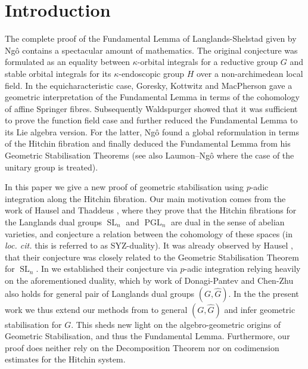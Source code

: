 \documentclass{article}
\DeclareMathOperator{\PGL}{PGL}
\DeclareMathOperator{\SL}{SL}
\theoremstyle{definition}
\theoremstyle{plain}
\begin{document}
\section{Introduction}

The complete proof of the Fundamental Lemma of Langlands-Shelstad given by Ng\^o \cite{MR2653248} contains a spectacular amount of mathematics. The original conjecture was formulated as an equality between $\kappa$-orbital integrals for a reductive group $G$ and stable orbital integrals for its $\kappa$-endoscopic group $H$ over a non-archimedean local field. In the equicharacteristic case, Goresky, Kottwitz and MacPherson \cite{GMK04} gave a geometric interpretation of the Fundamental Lemma in terms of the cohomology of affine Springer fibres. Subsequently Waldspurger \cite{Wa06} showed that it was sufficient to prove the function field case and further reduced the Fundamental Lemma to its Lie algebra version. For the latter, Ng\^o found a global reformulation in terms of the Hitchin fibration and finally deduced the Fundamental Lemma from his Geometric Stabilisation Theorems \cite[Theorem 6.4.1, Theorem 6.4.2]{MR2653248} (see also Laumon--Ng\^o \cite{MR2434884} where the case of the unitary group is treated).




In this paper we give a new proof of geometric stabilisation using $p$-adic integration along the Hitchin fibration. Our main motivation comes from the work of Hausel and Thaddeus \cite{MR1990670}, where they prove that the Hitchin fibrations for the Langlands dual groups $\SL_n$ and $\PGL_n$ are dual in the sense of abelian varieties, and conjecture a relation between the cohomology of these spaces (in \emph{loc. cit.} this is referred to as SYZ-duality). It was already observed by Hausel \cite[Section 5.4]{hausel2011global}, that their conjecture was closely related to the Geometric Stabilisation Theorem for $\SL_n$. In \cite{gwz} we established their conjecture via $p$-adic integration relying heavily on the aforementioned duality, which by work of Donagi-Pantev \cite{MR2957305} and Chen-Zhu \cite{chenzhu} also holds for general pair of Langlands dual groups $(G, \widehat{G})$. In the the present work we thus extend our methods from \cite{gwz} to general $(G, \widehat{G})$ and infer geometric stabilisation for $G$. This sheds new light on the algebro-geometric origins of Geometric Stabilisation, and thus the Fundamental Lemma. Furthermore, our proof does neither rely on the Decomposition Theorem nor on codimension estimates for the Hitchin system.
\end{document}
